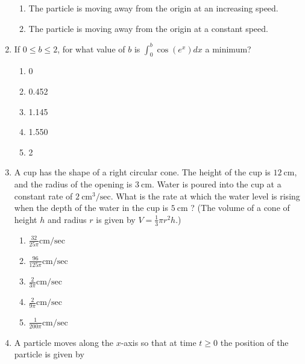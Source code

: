 \documentclass{article}
\begin{document}
\begin{enumerate}
\begin{minipage}[t]{\linewidth}
\begin{enumerate}
			\item The particle is moving away from the origin at an increasing speed.
			\item The particle is moving away from the origin at a constant speed.
		\end{enumerate}
	\end{minipage}
	\item
	\begin{minipage}[t]{\linewidth}
		If \(0 \leq b \leq 2\), for what value of \(b\) is
\(\int_{0}^{b} \cos \left(e^{x}\right) d x\) a minimum?
\vspace{1em}
		\begin{enumerate}
		\itemsep1em
			\item 0
			\item 0.452
			\item 1.145
			\item 1.550
			\item 2
		\end{enumerate}
	\end{minipage}
	\item
	\begin{minipage}[t]{\linewidth}
		A cup has the shape of a right circular cone. The height of the cup is
\(12 \mathrm{~cm}\), and the radius of the opening is
\(3 \mathrm{~cm}\). Water is poured into the cup at a constant rate of
\(2 \mathrm{~cm}^{3} / \mathrm{sec}\). What is the rate at which the
water level is rising when the depth of the water in the cup is
\(5 \mathrm{~cm}\) ? (The volume of a cone of height \(h\) and radius
\(r\) is given by \(V=\frac{1}{3} \pi r^{2} h\).)
\vspace{1em}
		\begin{enumerate}
		\itemsep1em
			\item \(\frac{32}{25 \pi} \mathrm{cm} / \mathrm{sec}\)
			\item \(\frac{96}{125 \pi} \mathrm{cm} / \mathrm{sec}\)
			\item \(\frac{2}{3 \pi} \mathrm{cm} / \mathrm{sec}\)
			\item \(\frac{2}{9 \pi} \mathrm{cm} / \mathrm{sec}\)
			\item \(\frac{1}{200 \pi} \mathrm{cm} / \mathrm{sec}\)
		\end{enumerate}
	\end{minipage}
	\item
	\begin{minipage}[t]{\linewidth}
		A particle moves along the \(x\)-axis so that at time \(t \geq 0\) the
position of the particle is given by

\end{minipage}
\end{enumerate}
\end{document}

